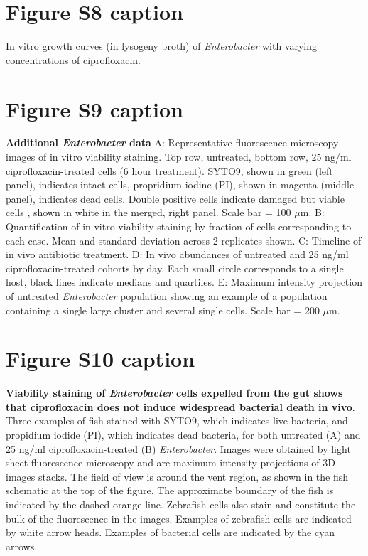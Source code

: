\documentclass[12pt]{article}
\begin{document}
\section*{Figure S8 caption}
In vitro growth curves (in lysogeny broth) of \textit{Enterobacter} with varying concentrations of ciprofloxacin.

\section*{Figure S9 caption}
\textbf{Additional \textit{Enterobacter} data}  A: Representative fluorescence microscopy images of in vitro viability staining. Top row, untreated, bottom row, 25 ng/ml ciprofloxacin-treated cells (6 hour treatment). SYTO9, shown in green (left panel), indicates intact cells, propridium iodine (PI), shown in magenta (middle panel), indicates dead cells. Double positive cells indicate damaged but viable cells \cite{ben2005genetic}, shown in white in the merged, right panel. Scale bar = 100 $\mu$m. B: Quantification of in vitro viability staining by fraction of cells corresponding to each case. Mean and standard deviation across 2 replicates shown. C: Timeline of in vivo antibiotic treatment. D: In vivo abundances of untreated and 25 ng/ml ciprofloxacin-treated cohorts by day. Each small circle corresponds to a single host, black lines indicate medians and quartiles. E: Maximum intensity projection of untreated \textit{Enterobacter} population showing an example of a population containing a single large cluster and several single cells. Scale bar = 200 $\mu$m.

\section*{Figure S10 caption}
\textbf{Viability staining of \textit{Enterobacter} cells expelled from the gut shows that ciprofloxacin does not induce widespread bacterial death in vivo}. Three examples of fish stained with SYTO9, which indicates live bacteria, and propidium iodide (PI), which indicates dead bacteria, for both untreated (A) and 25 ng/ml ciprofloxacin-treated (B) \textit{Enterobacter}. Images were obtained by light sheet fluorescence microscopy and are maximum intensity projections of 3D images stacks. The field of view is around the vent region, as shown in the fish schematic at the top of the figure. The approximate boundary of the fish is indicated by the dashed orange line. Zebrafish cells also stain and constitute the bulk of the fluorescence in the images. Examples of zebrafish cells are indicated by white arrow heads. Examples of bacterial cells are indicated by the cyan arrows.
\end{document}
